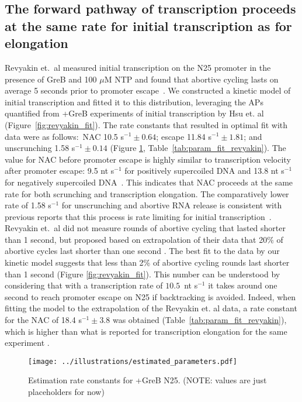 %
\subsection{The forward pathway of transcription proceeds at the same rate
for initial transcription as for elongation}
Revyakin et.\ al measured initial transcription on the N25 promoter in the
presence of GreB and 100 $\mu$M NTP and found that abortive cycling lasts on
average 5 seconds prior to promoter escape~\cite{revyakin_abortive_2006}. We
constructed a kinetic model of initial transcription and fitted it to this
distribution, leveraging the APs quantified from +GreB experiments of initial
transcription by Hsu et. al~\cite{hsu_initial_2006}
(Figure~\ref{fig:revyakin_fit}). The rate constants that resulted in 
optimal fit with data were as follows:~NAC 10.5 s$^{-1} \pm 0.64$; escape
11.84 s$^{-1} \pm 1.81$; and unscrunching 1.58 s$^{-1} \pm 0.14$ (Figure
\ref{fig:parameter_estimation}, Table~\ref{tab:param_fit_revyakin}). The value
for NAC before promoter escape is highly similar to transcription velocity
after promoter escape: 9.5 nt s$^{-1}$ for positively supercoiled DNA and 13.8
nt s$^{-1}$ for negatively supercoiled DNA~\cite{revyakin_abortive_2006}. This
indicates that NAC proceeds at the same rate for both scrunching and
transcription elongation. The comparatively lower rate of 1.58 s$^{-1}$ for
unscrunching and abortive RNA release is consistent with previous reports that
this process is rate limiting for initial
transcription~\cite{margeat_direct_2006, revyakin_abortive_2006}. Revyakin
et.\ al did not measure rounds of abortive cycling that lasted shorter than 1
second, but proposed based on extrapolation of their data that 20\% of
abortive cycles last shorter than one second \cite{revyakin_abortive_2006}.
The best fit to the data by our kinetic model suggests that less than 2\% of
abortive cycling rounds last shorter than 1 second (Figure
\ref{fig:revyakin_fit}). This number can be understood by considering that
with a transcription rate of $10.5$~nt s$^{-1}$ it takes around one second to
reach promoter escape on N25 if backtracking is avoided. Indeed, when fitting
the model to the extrapolation of the Revyakin et. al data, a rate constant
for the NAC of 18.4 s$^{-1} \pm 3.8$ was obtained
(Table~\ref{tab:param_fit_revyakin}), which is higher than what is reported
for transcription elongation for the same experiment
\cite{revyakin_abortive_2006}.

\begin{figure}
	\begin{center}
      \texttt{[image: ../illustrations/estimated\_parameters.pdf]}
	\end{center}
    \caption{Estimation rate constants for +GreB N25. (NOTE: values are just
    placeholders for now)}
    \label{fig:parameter_estimation}
\end{figure}

